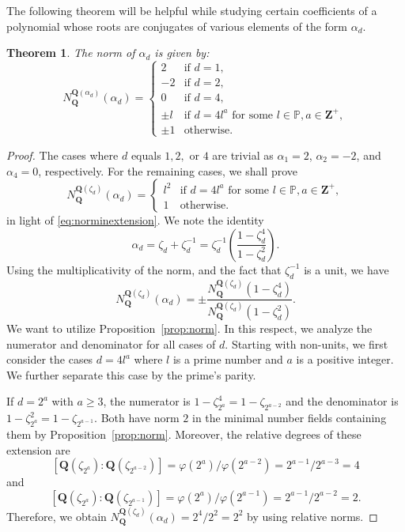 \documentclass{amsart}
\newcommand{\Q}{\mathbf Q}
\newcommand{\Z}{\mathbf Z}
\newcommand{\cycl}[1]{\Q(\zeta_{#1})}
\numberwithin{equation}{section}
\theoremstyle{plain}
\newtheorem{theorem}{Theorem}
\theoremstyle{definition}
\begin{document}
The following theorem will be helpful while studying certain coefficients of a polynomial whose roots are conjugates of various elements of the form $\alpha_d$. 

\begin{theorem}\label{thm:A1norminput}
The norm of $\alpha_d$ is given by:
\[N_{\Q}^{\Q(\alpha_d)}(\alpha_d) = 
\begin{cases} 
	2 & \text{if } d = 1, \\
	-2 & \text{if } d = 2, \\
	0 & \text{if } d = 4, \\
	\pm l & \text{if } d = 4l^a\text{ for some }l\in\mathbb{P}, a\in\Z^{+},\\
	\pm 1 & \text{otherwise}.
\end{cases}\]
\end{theorem}
\begin{proof}
The cases where $d$ equals $1,2,$ or $4$ are trivial as $\alpha_1=2$, $\alpha_2=-2$, and $\alpha_4=0$, respectively. For the remaining cases, we shall prove 
$$N_{\Q}^{\cycl{d}}(\alpha_d) = 
\begin{cases}
	l^2 & \text{if } d = 4l^a\text{ for some }l\in\mathbb{P}, a\in\Z^{+},\\
	1 & \text{otherwise}.
\end{cases}
$$
in light of \eqref{eq:norminextension}. We note the identity $$\alpha_d=\zeta_d+\zeta_d^{-1}=\zeta_d^{-1}\left(\frac{1-\zeta_d^4}{1-\zeta_d^2}\right).$$ 
Using the multiplicativity of the norm, and the fact that $\zeta_d^{-1}$ is a unit, we have
$$
N_{\Q}^{\cycl{d}}(\alpha_d)=\pm \frac{N_{\Q}^{\cycl{d}}\left(1-\zeta_d^4\right)}{N_{\Q}^{\cycl{d}}\left(1-\zeta_d^2\right)}.
$$
We want to utilize Proposition~\ref{prop:norm}. In this respect, we analyze the numerator and denominator for all cases of $d$. Starting with non-units, we first consider the cases $d=4l^a$ where $l$ is a prime number and $a$ is a positive integer. We further separate this case by the prime's parity.

If $d=2^a$ with $a\ge 3$, the numerator is $1-\zeta_{2^a}^4 = 1-\zeta_{2^{a-2}}$ and the denominator is $1-\zeta_{2^a}^2 = 1-\zeta_{2^{a-1}}$. Both have norm $2$ in the minimal number fields containing them by Proposition~\ref{prop:norm}. Moreover, the relative degrees of these extension are
$$[\cycl{2^a}:\cycl{2^{a-2}}] = \varphi(2^a)/\varphi(2^{a-2}) = 2^{a-1}/2^{a-3} = 4$$
and
$$[\cycl{2^a}:\cycl{2^{a-1}}] = \varphi(2^a)/\varphi(2^{a-1}) = 2^{a-1}/2^{a-2} = 2.$$
Therefore, we obtain $N_{\Q}^{\cycl{d}}(\alpha_d) = 2^4/2^2 = 2^2$ by using relative norms.
	

\end{proof}
\end{document}

